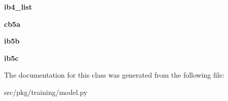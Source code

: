 \begin{DoxyCompactItemize}
{\bfseries ib4\+\_\+list}
\item 
\mbox{\label{classrnb-planning_1_1src_1_1pkg_1_1training_1_1model_1_1_res_net_a02d866622a648e30257917d8715ebce2}} 
{\bfseries cb5a}
\item 
\mbox{\label{classrnb-planning_1_1src_1_1pkg_1_1training_1_1model_1_1_res_net_a9c479e1778b71f3514e52dad5429c27a}} 
{\bfseries ib5b}
\item 
\mbox{\label{classrnb-planning_1_1src_1_1pkg_1_1training_1_1model_1_1_res_net_aea2ef49569360159e8b6da4b22ab0c58}} 
{\bfseries ib5c}
\end{DoxyCompactItemize}


The documentation for this class was generated from the following file\+:\begin{DoxyCompactItemize}
\item 
src/pkg/training/model.\+py\end{DoxyCompactItemize}
